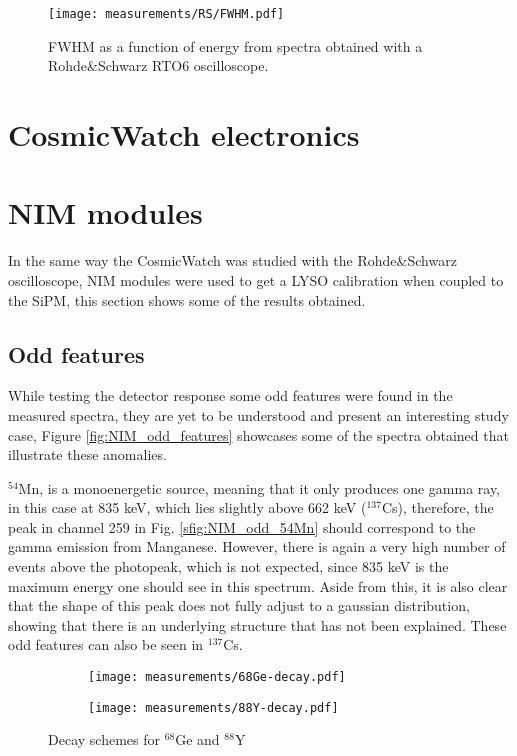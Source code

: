 \begin{figure}[H]
  \centering
  \texttt{[image: measurements/RS/FWHM.pdf]}
  \caption{\label{fig:RS_FWHM}FWHM as a function of energy from spectra obtained with a Rohde\&Schwarz RTO6 oscilloscope.}
\end{figure}

\section{CosmicWatch electronics}

\section{NIM modules}

In the same way the CosmicWatch was studied with the Rohde\&Schwarz oscilloscope, NIM modules were used to get a LYSO calibration when coupled to the SiPM, this section shows some of the results obtained.

\subsection{Odd features}

While testing the detector response some odd features were found in the measured spectra, they are yet to be understood and present an interesting study case, Figure \ref{fig:NIM_odd_features} showcases some of the spectra obtained that illustrate these anomalies. 

$^{54}$Mn, is a monoenergetic source, meaning that it only produces one gamma ray, in this case at 835 \unit{\kilo\eV}, which lies slightly above 662 \unit{\kilo\eV} ($^{137}$Cs), therefore, the peak in channel 259 in Fig. \ref{sfig:NIM_odd_54Mn} should correspond to the gamma emission from Manganese. However, there is again a very high number of events above the photopeak, which is not expected, since 835 \unit{\kilo\eV} is the maximum energy one should see in this spectrum. Aside from this, it is also clear that the shape of this peak does not fully adjust to a gaussian distribution, showing that there is an underlying structure that has not been explained. These odd features can also be seen in $^{137}$Cs.

\begin{figure}[H]
  \centering
  \begin{subfigure}[t]{0.53\textwidth}
    \texttt{[image: measurements/68Ge-decay.pdf]}
    \caption{\label{sfig:68Ge}}
  \end{subfigure}
  \begin{subfigure}[t]{0.425\textwidth}
    \texttt{[image: measurements/88Y-decay.pdf]}
    \caption{\label{sfig:88Y}}
  \end{subfigure}
  \caption{\label{fig:some_decay_schemes}Decay schemes for $^{68}$Ge and $^{88}$Y}
\end{figure}

